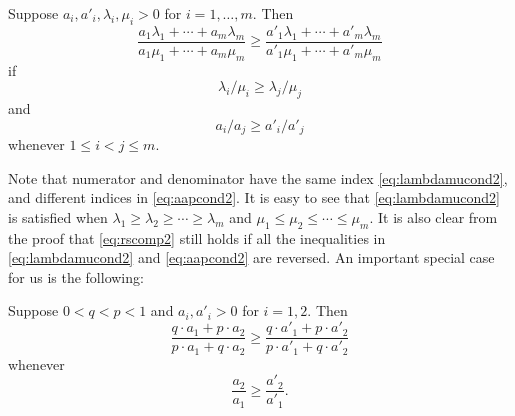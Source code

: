 \documentclass[11pt,draft]{article}
\begin{document}

\begin{lem} \label{lem:rscomp2}
Suppose $a_i,a'_i,\lambda_i,\mu_i > 0$ for $i=1,\dots,m$.
Then
\begin{equation} \label{eq:rscomp2}
\frac{a_1\lambda_1 + \cdots + a_m\lambda_m}
{a_1\mu_1 + \cdots + a_m\mu_m} \geq
\frac{a'_1\lambda_1 + \cdots + a'_m\lambda_m}
{a'_1\mu_1 + \cdots + a'_m\mu_m}
\end{equation}
if
\begin{equation} \label{eq:lambdamucond2}
\lambda_i/\mu_i \geq  \lambda_j/\mu_j
\end{equation}
and
\begin{equation} \label{eq:aapcond2}
a_i/a_j \geq a'_i/a'_j
\end{equation}
whenever $1 \leq i < j \leq m$.
\end{lem}
Note that numerator and denominator have the same index \eqref{eq:lambdamucond2}, and different indices in \eqref{eq:aapcond2}.
It is easy to see that \eqref{eq:lambdamucond2} is satisfied when
$\lambda_1 \geq \lambda_2 \geq \cdots \geq \lambda_m$ and
$\mu_1 \leq \mu_2 \leq \cdots \leq \mu_m$.
It is also clear from the proof that \eqref{eq:rscomp2} still holds if all the inequalities in \eqref{eq:lambdamucond2} and \eqref{eq:aapcond2} are reversed.
An important special case for us is the following:
\begin{cor}
Suppose $0 < q < p < 1$ and $a_i, a'_i > 0$ for $i = 1,2$.
Then
\[ \frac{q \cdot a_1 + p\cdot a_2}{p\cdot a_1 + q\cdot a_2} \geq
\frac{q\cdot a'_1 + p\cdot a'_2}{p\cdot a'_1 + q\cdot a'_2} \]
whenever
\[ \frac{a_2}{a_1} \geq \frac{a'_2}{a'_1}. \]
\end{cor}
\end{document}
